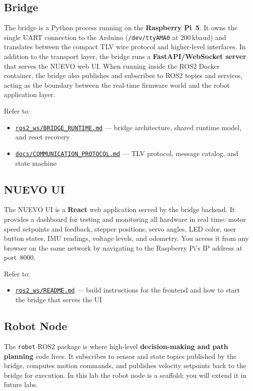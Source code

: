 \documentclass{ol-softwaremanual}
\newcommand{\doclink}[2]{\href{#1}{#2}}
\begin{document}
\subsection*{Bridge}
The bridge is a Python process running on the \textbf{Raspberry Pi~5}.
It owns the single UART connection to the Arduino (\texttt{/dev/ttyAMA0} at 200\,kbaud)
and translates between the compact TLV wire protocol and higher-level interfaces.
In addition to the transport layer, the bridge runs a \textbf{FastAPI/WebSocket server}
that serves the NUEVO web UI.
When running inside the ROS2 Docker container, the bridge also publishes and subscribes
to ROS2 topics and services, acting as the boundary between the real-time firmware world
and the robot application layer.

Refer to:
\begin{itemize}
  \item \doclink{https://github.com/pochihh/Project-NUEVO/blob/main/ros2_ws/BRIDGE_RUNTIME.md}{\texttt{ros2\_ws/BRIDGE\_RUNTIME.md}} --- bridge architecture, shared runtime model, and reset recovery
  \item \doclink{https://github.com/pochihh/Project-NUEVO/blob/main/docs/COMMUNICATION_PROTOCOL.md}{\texttt{docs/COMMUNICATION\_PROTOCOL.md}} --- TLV protocol, message catalog, and state machine
\end{itemize}

\subsection*{NUEVO UI}
The NUEVO UI is a \textbf{React} web application served by the bridge backend.
It provides a dashboard for testing and monitoring all hardware in real time:
motor speed setpoints and feedback, stepper positions, servo angles, LED color,
user button states, IMU readings, voltage levels, and odometry.
You access it from any browser on the same network by navigating to the
Raspberry Pi's IP address at port~8000.

Refer to:
\begin{itemize}
  \item \doclink{https://github.com/pochihh/Project-NUEVO/blob/main/ros2_ws/README.md}{\texttt{ros2\_ws/README.md}} --- build instructions for the frontend and how to start the bridge that serves the UI
\end{itemize}

\subsection*{Robot Node}
The \texttt{robot} ROS2 package is where high-level \textbf{decision-making and path planning}
code lives.
It subscribes to sensor and state topics published by the bridge, computes motion commands,
and publishes velocity setpoints back to the bridge for execution.
In this lab the robot node is a scaffold; you will extend it in future labs.
\end{document}

